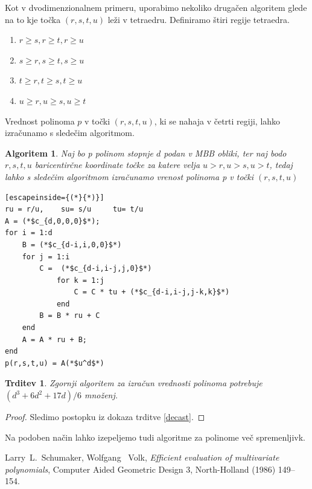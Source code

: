 \documentclass{article}
\newtheorem{algoritm}{Algoritem}[section]
\newtheorem{trditev}{Trditev}[section]
\begin{document}
Kot v dvodimenzionalnem primeru, uporabimo nekoliko drugačen algoritem glede na to kje točka $(r, s, t, u)$ leži v tetraedru.
Definiramo štiri regije tetraedra.

\begin{enumerate}
\item $r\geq s, r\geq t, r\geq u$
\item $s\geq r, s\geq t, s\geq u$
\item $t\geq r, t\geq s, t\geq u$
\item $u\geq r,u\geq s, u\geq t$
\end{enumerate}


Vrednost polinoma $p$ v točki $(r,s,t,u)$, ki se nahaja v četrti regiji, lahko izračunamo s sledečim algoritmom.

\begin{algoritm}
Naj bo p polinom stopnje $d$ podan v MBB obliki, ter naj bodo $ r,s,t,u$ baricentirčne koordinate točke za katere velja $u > r,u > s, u>t$, tedaj lahko s sledečim algoritmom izračunamo vrenost polinoma p v točki $(r,s,t,u)$

\begin{lstlisting}[escapeinside={(*}{*)}]
ru = r/u,	 su= s/u	 tu= t/u
A = (*$c_{d,0,0,0}$*);
for i = 1:d
    B = (*$c_{d-i,i,0,0}$*)
    for j = 1:i
        C =  (*$c_{d-i,i-j,j,0}$*)
            for k = 1:j
                C = C * tu + (*$c_{d-i,i-j,j-k,k}$*)
            end
        B = B * ru + C
    end
    A = A * ru + B;
end
p(r,s,t,u) = A(*$u^d$*)
\end{lstlisting}
\end{algoritm}

\begin{trditev}
Zgornji algoritem za izračun vrednosti polinoma potrebuje $(d^3+ 6d^2 + 17d)/6$ množenj.
\end{trditev}

\begin{proof}
Sledimo postopku iz dokaza trditve \ref{decast}.
\end{proof}

Na podoben način lahko izepeljemo tudi algoritme za polinome več spremenljivk.


\begin{thebibliography}{9}

Larry~L.~Schumaker, Wolfgang ~Volk, \emph{Efficient evaluation of multivariate
polynomials}, Computer Aided Geometric Design 3, North-Holland (1986) 149--154.

\end{thebibliography}
\end{document}
